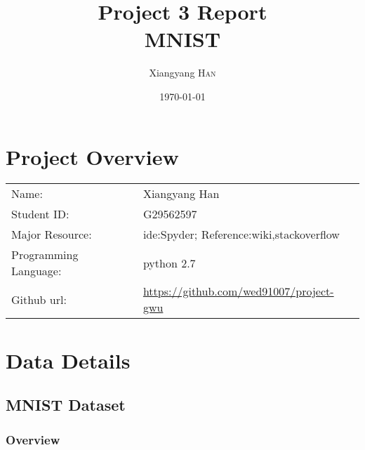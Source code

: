 \documentclass{article}
\title{Project 3 Report \\ MNIST} %
\author{Xiangyang \textsc{Han}} %
\date{\today} %
\begin{document}
\maketitle %



\section{Project Overview}


\begin{tabular}{ll}
Name:&Xiangyang Han\\
Student ID:&G29562597\\
Major Resource:&ide:Spyder; Reference:wiki,stackoverflow\\
Programming Language:&python 2.7\\
Github url:&\url{https://github.com/wed91007/project-gwu}
\end{tabular}




 

\section{Data Details}

\subsection{MNIST Dataset}
\subsubsection{Overview}
\end{document}
